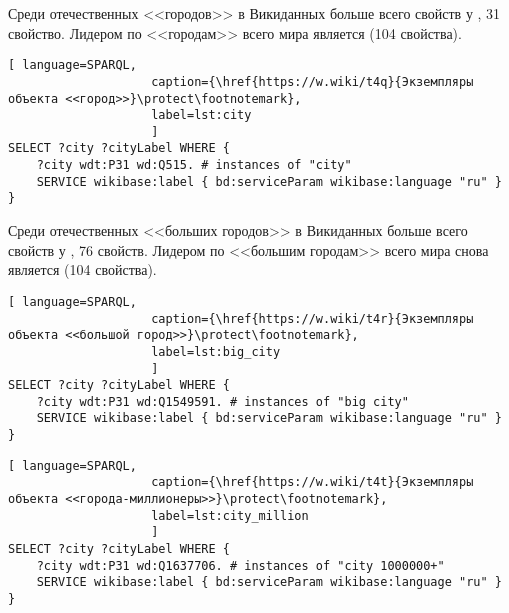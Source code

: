 Среди отечественных <<городов>> в Викиданных больше всего свойств 
у , 31 свойство\autocite{city_prowd}. 
Лидером по <<городам>> всего мира является  (104 свойства).

\begin{lstlisting}[ language=SPARQL, 
                    caption={\href{https://w.wiki/t4q}{Экземпляры объекта <<город>>}\protect\footnotemark},
                    label=lst:city
                    ]
SELECT ?city ?cityLabel WHERE {
	?city wdt:P31 wd:Q515. # instances of "city"
	SERVICE wikibase:label { bd:serviceParam wikibase:language "ru" }
}
\end{lstlisting}

Среди отечественных <<больших городов>> в Викиданных больше всего свойств 
у , 76 свойств\autocite{big_city_prowd}. 
Лидером по <<большим городам>> всего мира снова является  (104 свойства).

\begin{lstlisting}[ language=SPARQL, 
                    caption={\href{https://w.wiki/t4r}{Экземпляры объекта <<большой город>>}\protect\footnotemark},
                    label=lst:big_city
                    ]
SELECT ?city ?cityLabel WHERE {
	?city wdt:P31 wd:Q1549591. # instances of "big city"    
	SERVICE wikibase:label { bd:serviceParam wikibase:language "ru" }
}
\end{lstlisting}




\newpage
\begin{lstlisting}[ language=SPARQL, 
                    caption={\href{https://w.wiki/t4t}{Экземпляры объекта <<города-миллионеры>>}\protect\footnotemark},
                    label=lst:city_million
                    ]
SELECT ?city ?cityLabel WHERE {
	?city wdt:P31 wd:Q1637706. # instances of "city 1000000+" 
	SERVICE wikibase:label { bd:serviceParam wikibase:language "ru" }
}
\end{lstlisting}

